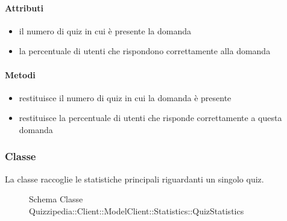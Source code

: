 \paragraph{Attributi}
\begin{itemize}
\item {}
\newline
il numero di quiz in cui è presente la domanda
\item {}
\newline
la percentuale di utenti che rispondono correttamente alla domanda
\end{itemize}
\paragraph{Metodi}
\begin{itemize}
\item {}
\newline
restituisce il numero di quiz in cui la domanda è presente
\newline
\item {}
\newline
restituisce la percentuale di utenti che risponde correttamente a questa domanda
\newline
\end{itemize}
\subsubsection{Classe }
La classe raccoglie le statistiche principali riguardanti un singolo quiz.
\begin{figure}[H]
\centering
\noindent{}
\caption[Schema Classe QuizStatistics]{Schema Classe Quizzipedia::Client::ModelClient::Statistics::QuizStatistics}
\end{figure}
